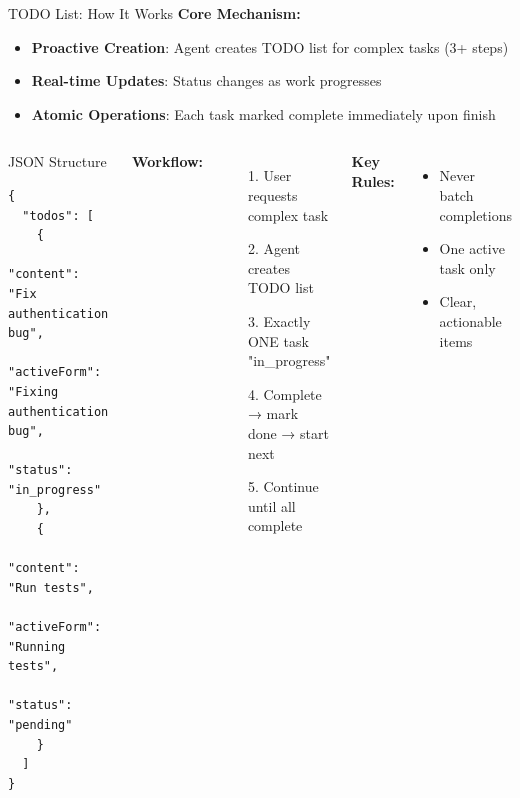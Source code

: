 \documentclass[aspectratio=169]{beamer}
\begin{document}
\begin{frame}[fragile]{TODO List: How It Works}
	\textbf{Core Mechanism:}
	\begin{itemize}
		\item {\color{highlight}\textbf{Proactive Creation}}: Agent creates TODO list for complex tasks (3+ steps)
		\item {\color{highlight}\textbf{Real-time Updates}}: Status changes as work progresses
		\item {\color{highlight}\textbf{Atomic Operations}}: Each task marked complete immediately upon finish
	\end{itemize}
	
	\begin{columns}
		\begin{block}{JSON Structure}
			\footnotesize
			\begin{lstlisting}[basicstyle=\tiny]
{
  "todos": [
    {
      "content": "Fix authentication bug",
      "activeForm": "Fixing authentication bug", 
      "status": "in_progress"
    },
    {
      "content": "Run tests",
      "activeForm": "Running tests",
      "status": "pending"  
    }
  ]
}
			\end{lstlisting}
		\end{block}
		
		\textbf{Workflow:}
		\begin{itemize}
			\item[1.] User requests complex task
			\item[2.] Agent creates TODO list
			\item[3.] Exactly ONE task "in\_progress" 
			\item[4.] Complete → mark done → start next
			\item[5.] Continue until all complete
		\end{itemize}
		
		\textbf{Key Rules:}
		\begin{itemize}
			\item Never batch completions
			\item One active task only
			\item Clear, actionable items
		\end{itemize}
	\end{columns}
\end{frame}
\end{document}
